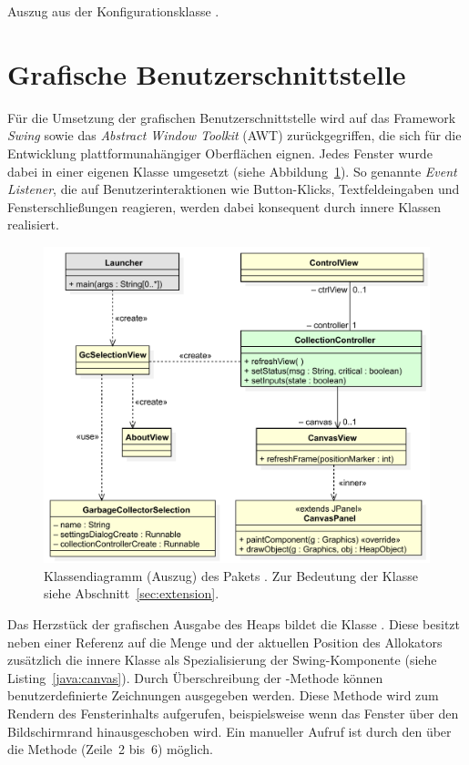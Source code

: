 \begin{listing}[h]
	\inputminted[]{java}{code/Settings.java}
	\caption[Auszug aus der Konfigurationsklasse ]{Auszug aus der Konfigurationsklasse .}
	\label{java:settings}
\end{listing}

\section{Grafische Benutzerschnittstelle}
\label{sec:gui}
Für die Umsetzung der grafischen Benutzerschnittstelle wird auf das Framework \textit{Swing} sowie das \textit{Abstract Window Toolkit} (AWT) zurückgegriffen, die sich für die Entwicklung plattformunahängiger Oberflächen eignen.
Jedes Fenster wurde dabei in einer eigenen Klasse umgesetzt (siehe Abbildung~\ref{fig:gui}).
So genannte \textit{Event Listener}, die auf Benutzerinteraktionen wie Button-Klicks, Textfeldeingaben und Fensterschließungen reagieren, werden dabei konsequent durch innere Klassen
realisiert.

\begin{figure}[h]
	\centering
	\includegraphics[scale=0.6]{img/uml/ch7-gui.pdf}
	\caption[Klassendiagramm des Pakets ]{Klassendiagramm (Auszug) des Pakets . Zur Bedeutung der Klasse  siehe Abschnitt~\ref{sec:extension}.}
	\label{fig:gui}
\end{figure}

Das Herzstück der grafischen Ausgabe des Heaps bildet die Klasse .
Diese besitzt neben einer Referenz auf die Menge  und der aktuellen Position des Allokators zusätzlich die innere Klasse  als Spezialisierung der Swing-Komponente  (siehe Listing~\ref{java:canvas}).
Durch Überschreibung der -Methode können benutzerdefinierte Zeichnungen ausgegeben werden.
Diese Methode wird zum Rendern des Fensterinhalts aufgerufen, beispielsweise wenn das Fenster über den Bildschirmrand hinausgeschoben wird.
Ein manueller Aufruf ist durch den  über die Methode  (Zeile~2 bis~6) möglich.

